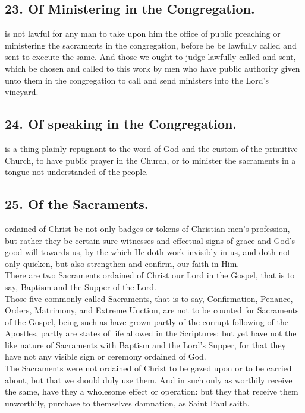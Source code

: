 \subsection{23. Of Ministering in the Congregation.}
 is not lawful for any man to take upon him the office of public preaching or ministering the sacraments in the congregation, before he be lawfully called and sent to execute the same. And those we ought to judge lawfully called and sent, which be chosen and called to this work by men who have public authority given unto them in the congregation to call and send ministers into the Lord's vineyard.

\subsection{24. Of speaking in the Congregation.}
 is a thing plainly repugnant to the word of God and the custom of the primitive Church, to have public prayer in the Church, or to minister the sacraments in a tongue not understanded of the people.

\newpage

\subsection{25. Of the Sacraments.}
 ordained of Christ be not only badges or tokens of Christian men's profession, but rather they be certain sure witnesses and effectual signs of grace and God's good will towards us, by the which He doth work invisibly in us, and doth not only quicken, but also strengthen and confirm, our faith in Him.\\
There are two Sacraments ordained of Christ our Lord in the Gospel, that is to say, Baptism and the Supper of the Lord.\\
Those five commonly called Sacraments, that is to say, Confirmation, Penance, Orders, Matrimony, and Extreme Unction, are not to be counted for Sacraments of the Gospel, being such as have grown partly of the corrupt following of the Apostles, partly are states of life allowed in the Scriptures; but yet have not the like nature of Sacraments with Baptism and the Lord's Supper, for that they have not any visible sign or ceremony ordained of God.\\
The Sacraments were not ordained of Christ to be gazed upon or to be carried about, but that we should duly use them. And in such only as worthily receive the same, have they a wholesome effect or operation: but they that receive them unworthily, purchase to themselves damnation, as Saint Paul saith.

